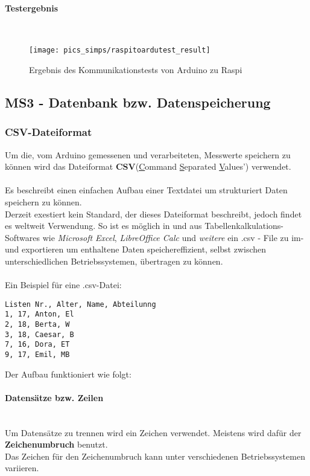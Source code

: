 \documentclass[12pt,a4paper]{article}
\begin{document}
\paragraph{Testergebnis}\mbox{}\\
\begin{figure}[h!]
	\centering
	\texttt{[image: pics\_simps/raspitoardutest\_result]}
	\caption{Ergebnis des Kommunikationstests von Arduino zu Raspi}
\end{figure}
%
%
\newpage
\subsection{MS3 - Datenbank bzw. Datenspeicherung}
\subsubsection*{CSV-Dateiformat}
Um die, vom Arduino gemessenen und verarbeiteten, Messwerte speichern zu können wird das 
Dateiformat {\bf CSV}(\underline{C}ommand \underline{S}eparated \underline{V}alues') verwendet. \\\\
%
Es beschreibt einen einfachen Aufbau einer Textdatei um strukturiert Daten speichern zu können. \\
Derzeit exestiert kein Standard, der dieses Dateiformat beschreibt, jedoch findet es weltweit Verwendung. 
So ist es möglich in und aus Tabellenkalkulations-Softwares wie {\it Microsoft Excel}, {\it LibreOffice Calc} 
und {\it weitere} ein .csv - File zu im- und exportieren um enthaltene Daten speichereffizient, selbst 
zwischen unterschiedlichen Betriebssystemen, übertragen zu können. \\\\
%
Ein Beispiel für eine .csv-Datei:
\begin{lstlisting}[frame=single]
Listen Nr., Alter, Name, Abteilunng
1, 17, Anton, El
2, 18, Berta, W
3, 18, Caesar, B
7, 16, Dora, ET
9, 17, Emil, MB
\end{lstlisting}
%
\vspace{10mm}
Der Aufbau funktioniert wie folgt:
%
\paragraph{Datensätze bzw. Zeilen}\mbox{}\\
Um Datensätze zu trennen wird ein Zeichen verwendet. Meistens wird dafür der {\bf Zeichenumbruch} benutzt. \\
Das Zeichen für den Zeichenumbruch kann unter verschiedenen Betriebssystemen variieren. \\
%
\end{document}
